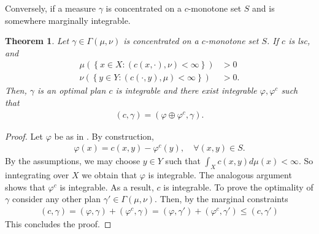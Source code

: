 \documentclass[
    a4paper,
    DIV=14,
    abstract=true,
    numbers=noenddot
]
{scrartcl}
\newtheorem{theorem}{Theorem}[section]
\theoremstyle{definition}
\newenvironment{aligneq}{\begin{equation}\begin{aligned}}{\end{aligned}\end{equation}}
\begin{document}
Conversely, if a measure $\gamma $ is concentrated on a $c$-monotone set $S$ and is somewhere marginally integrable.
\begin{theorem}\label{tm: c-monotone implies optimal}
    Let  $\gamma \in \Gamma(\mu ,\nu )$  is concentrated on a $c$-monotone set $S$. If $c$ is lsc, and
    \begin{aligneq}\label{finite}
        \mu\left(\left\{x \in X : (c(x,\cdot ),\nu) < \infty\right\}\right)&>0\\
        \nu\left(\left\{y \in Y :(c(\cdot ,y),\mu) < \infty\right\}\right) &> 0.
    \end{aligneq}
    Then, $\gamma$ is an optimal plan $c$ is integrable and there exist integrable $\varphi, \varphi ^c$ such that
    \begin{align*}
        (c, \gamma )=(\varphi\oplus \varphi ^c, \gamma ).
    \end{align*}
\end{theorem}
\begin{proof}
    Let $\varphi$ be as in . By construction,
    \begin{align*}
        \varphi (x)= c(x,y)- \varphi ^c(y), \quad\forall (x,y) \in S.
    \end{align*}
    By the assumptions, we may choose $y \in Y$ such that $\int_{X} c(x,y) d\mu (x)<\infty$. So inntegrating over $X$ we obtain that $\varphi$ is integrable. The analogous argument shows that $\varphi ^c$ is integrable. As a result, $c$ is integrable. To prove the optimality of $\gamma $ consider any other plan $\gamma ' \in \Gamma (\mu ,\nu )$. Then, by the marginal constraints
    \begin{align*}
        (c,\gamma)=(\varphi,\gamma )+(\varphi ^c,\gamma )=(\varphi,\gamma ')+(\varphi ^c,\gamma ') \leq (c,\gamma ')
    \end{align*}
    This concludes the proof.
\end{proof}
\end{document}
